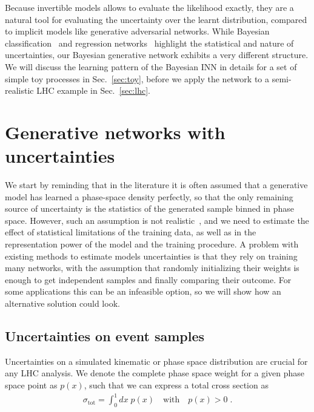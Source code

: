 Because invertible models allows to evaluate the likelihood exactly, 
they are a natural tool for evaluating the uncertainty over the learnt
distribution, compared to implicit models like generative adversarial networks.
While Bayesian classification~\cite{Bollweg:2019skg} and regression
networks~\cite{Kasieczka:2020vlh} highlight the statistical and
nature of uncertainties, our Bayesian generative network
exhibits a very different structure. We will discuss the learning
pattern of the Bayesian INN in details for a set of simple toy
processes in Sec.~\ref{sec:toy}, before we apply the network to a
semi-realistic LHC example in Sec.~\ref{sec:lhc}.

\section{Generative networks with uncertainties}
\label{sec:nets}

We start by reminding that in the literature it is often assumed 
that a generative model has learned a phase-space density perfectly, 
so that the only remaining source of uncertainty is the statistics of the generated
sample binned in phase space.  However, such an assumption is not 
realistic~\cite{Bollweg:2019skg,Kasieczka:2020vlh},
and we need to estimate the effect of statistical limitations of the training data,
as well as in the representation power of the model and the training procedure. 
A problem with existing methods to estimate models uncertainties is that they
rely on training many networks, with the assumption that randomly initializing their weights
 is enough to get independent samples and finally comparing their
outcome. For some applications this can be an infeasible option, 
so we will show how an alternative solution could look.

\subsection{Uncertainties on event samples}
\label{sec:nets_unc}

Uncertainties on a simulated kinematic or phase space distribution are
crucial for any LHC analysis. We denote the complete phase space weight 
for a given phase space point as $p(x)$, such that we can express a total cross
section as
%
\begin{align}
  \sigma_\text{tot} = \int_0^1 dx \; p(x)
  \quad \text{with} \quad p(x)>0 \; .
\end{align}
%

